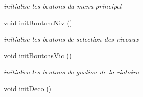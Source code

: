 \begin{DoxyCompactItemize}
\begin{DoxyCompactList}\small\item\em initialise les boutons du menu principal \end{DoxyCompactList}\item 
void \hyperlink{classaffichageSDL_afa0b67e5ab733f1b5b981e136fc482ab}{init\+Boutons\+Niv} ()\hypertarget{classaffichageSDL_afa0b67e5ab733f1b5b981e136fc482ab}{}\label{classaffichageSDL_afa0b67e5ab733f1b5b981e136fc482ab}

\begin{DoxyCompactList}\small\item\em initialise les boutons de selection des niveaux \end{DoxyCompactList}\item 
void \hyperlink{classaffichageSDL_af3fcae871a3042608370425f3b60019a}{init\+Boutons\+Vic} ()\hypertarget{classaffichageSDL_af3fcae871a3042608370425f3b60019a}{}\label{classaffichageSDL_af3fcae871a3042608370425f3b60019a}

\begin{DoxyCompactList}\small\item\em initialise les boutons de gestion de la victoire \end{DoxyCompactList}\item 
void \hyperlink{classaffichageSDL_a6f2066f410cd54487e1c3370de19808a}{init\+Deco} ()\hypertarget{classaffichageSDL_a6f2066f410cd54487e1c3370de19808a}{}\label{classaffichageSDL_a6f2066f410cd54487e1c3370de19808a}


\end{DoxyCompactItemize}

